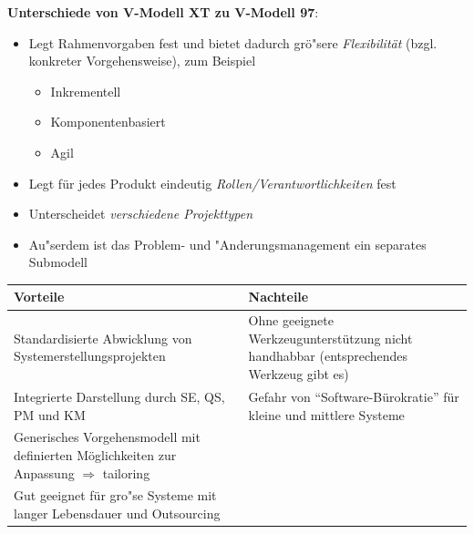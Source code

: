 \documentclass[a4paper,12pt]{article}
\begin{document}
	\textbf{Unterschiede von V-Modell XT zu V-Modell 97}:
	\begin{itemize}
		\item Legt Rahmenvorgaben fest und bietet dadurch grö"sere \textit{Flexibilität} (bzgl. konkreter Vorgehensweise), zum Beispiel
		\begin{itemize}
			\item Inkrementell
			\item Komponentenbasiert
			\item Agil
		\end{itemize}
		\item Legt für jedes Produkt eindeutig \textit{Rollen/Verantwortlichkeiten} fest
		\item Unterscheidet \textit{verschiedene Projekttypen}
		\item Au"serdem ist das Problem- und "Anderungsmanagement ein separates Submodell
	\end{itemize}
	\begin{center}
		\begin{tabularx}{13cm}{X|X}
			\hline 
			Vorteile & Nachteile\\ \hline \hline
			Standardisierte Abwicklung von Systemerstellungsprojekten & Ohne geeignete Werkzeugunterstützung nicht handhabbar (entsprechendes Werkzeug gibt es) \\ \hline
			Integrierte Darstellung durch SE, QS, PM und KM & Gefahr von "`Software-Bürokratie"' für kleine und mittlere Systeme \\ \hline
			Generisches Vorgehensmodell mit definierten Möglichkeiten zur Anpassung $\Rightarrow$ tailoring & \\ \hline
			Gut geeignet für gro"se Systeme mit langer Lebensdauer und Outsourcing & 
			
		\end{tabularx}
	\end{center}
	\newpage
\end{document}
